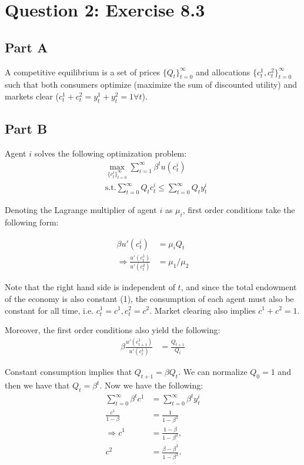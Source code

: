 \documentclass[11pt]{article} %
\begin{document}
\section{Question 2: Exercise 8.3}
\subsection{Part A}
A competitive equilibrium is a set of prices $\{Q_t\}_{t=0}^{\infty}$ and allocations $\{ c_t^1,c_t^2 \}_{t=0}^{\infty}$ such that both consumers optimize (maximize the sum of discounted utility) and markets clear ($c^1_t + c^2_t = y_t^1 + y_t^2 = 1 \forall t$).
\subsection{Part B}
Agent $i$ solves the following optimization problem:
\begin{align*}
&\max_{\{ c_{t}^i\}_{t=0}^{\infty}} \sum_{i=1}^{\infty}\beta^t u(c_{t}^i)\\
&\text{s.t.} \sum_{t=0}^{\infty}Q_tc_{t}^i \leq \sum_{t=0}^{\infty} Q_t y_{t}^i
\end{align*}

Denoting the Lagrange multiplier of agent $i$ as $\mu_i$, first order conditions take the following form:

\begin{align*}
\beta u'(c_t^i) &= \mu_i Q_t\\
\Rightarrow \frac{u'(c_t^1)}{u'(c_t^2)} &= \mu_1/\mu_2
\end{align*}

Note that the right hand side is independent of $t$, and since the total endowment of the economy is also constant (1), the consumption of each agent must also be constant for all time, i.e. $c_t^1 = c^1, c_t^2 = c^2.$ Market clearing also implies $c^1+c^2 = 1.$

Moreover, the first order conditions also yield the following:
\begin{align*}
\beta\frac{u'(c_{t+1}^1)}{u'(c_{t}^1)} &= \frac{Q_{t+1}}{Q_t}
\end{align*}

Constant consumption implies that $Q_{t+1} = \beta Q_t$. We can normalize $Q_0 = 1$ and then we have that $Q_{t} = \beta^t$. Now we have the following:
\begin{align*}
\sum_{t=0}^{\infty}\beta^t c^1 &= \sum_{t=0}^{\infty}\beta^t y_{t}^i\\
\frac{c^1}{1-\beta} &= \frac{1}{1-\beta^3}\\
\Rightarrow c^1 &= \frac{1-\beta}{1-\beta^3},\\
c^2 &= \frac{\beta - \beta^3}{1-\beta^3}.
\end{align*}
\end{document}
